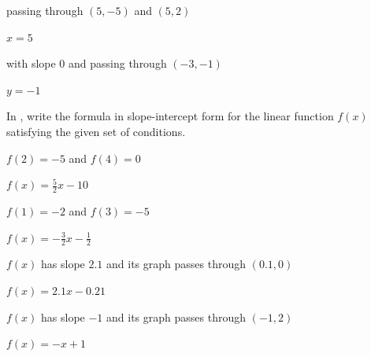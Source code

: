 \begin{exercise}
passing through $(5,-5)$ and $(5,2)$
\end{exercise}

\begin{solution}
    $x=5$
\end{solution}



\begin{exercise}\label{exercise-2.2.8}
with slope 0 and passing through $(-3,-1)$
\end{exercise}

\begin{solution}
    $y=-1$
\end{solution}





 In , write the formula in slope-intercept form for the linear function $f(x)$ satisfying the given set of conditions.

\begin{exercise}\label{exercise-2.2.9}
$f(2)=-5$ and $f(4)=0$
\end{exercise}

\begin{solution}
    $f(x)=\frac{5}{2}x-10$
\end{solution}



\begin{exercise}
$f(1)=-2$ and $f(3)=-5$
\end{exercise}

\begin{solution}
    $f(x)=-\frac{3}{2}x-\frac{1}{2}$
\end{solution}



\begin{exercise}
$f(x)$ has slope $2.1$ and its graph passes through $(0.1,0)$
\end{exercise}

\begin{solution}
    $f(x)=2.1x-0.21$
\end{solution}



\begin{exercise}
$f(x)$ has slope $-1$ and its graph passes through $(-1,2)$
\end{exercise}

\begin{solution}
    $f(x)=-x+1$
\end{solution}




